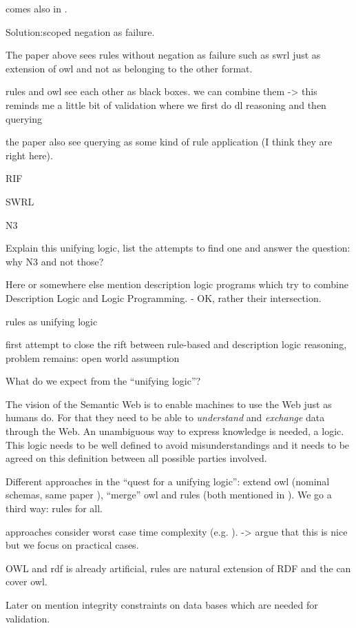 comes also in \cite{rearch}.

Solution:scoped negation as failure.

The paper above sees rules without negation as failure such as swrl just as extension of owl and not as belonging to the other format.

rules and owl see each other as black boxes.
we can combine them
-> this reminds me a little bit of validation where we first do dl reasoning and then querying

the paper also see querying as some kind of rule application (I think they are right here).


RIF

SWRL

N3

\cite{N3Logic}

Explain this unifying logic, list the attempts to find one and answer the question: why N3 and not those?



Here or somewhere else mention description logic programs \cite{DLP} which try to combine Description Logic and Logic Programming. - OK, rather their intersection.

\cite{knorr} rules as unifying logic

\cite{unilogic} first attempt to close the rift between rule-based and description logic reasoning, problem remains: open world assumption


What do we expect from the ``unifying logic''?

The vision of the Semantic Web is to enable machines to use the Web just as humans do. For that they need to be able to \emph{understand} and \emph{exchange} data through the Web. 
An unambiguous way to express knowledge is needed, a logic. 
This logic needs to be well defined to avoid misunderstandings and it needs to be agreed on this definition between all possible parties involved.


Different approaches in the ``quest for a unifying logic'': extend owl (nominal schemas, same paper \cite{unilogic}), ``merge'' owl and rules (both mentioned in \cite{unilogic}). We go a third way: rules for all.

approaches consider worst case time complexity (e.g. \cite{unilogic}). -> argue that this is nice but we focus on practical cases.

OWL and rdf is already artificial, rules are natural extension of RDF and the can cover owl.

Later on mention integrity constraints on data bases which are needed for validation.

